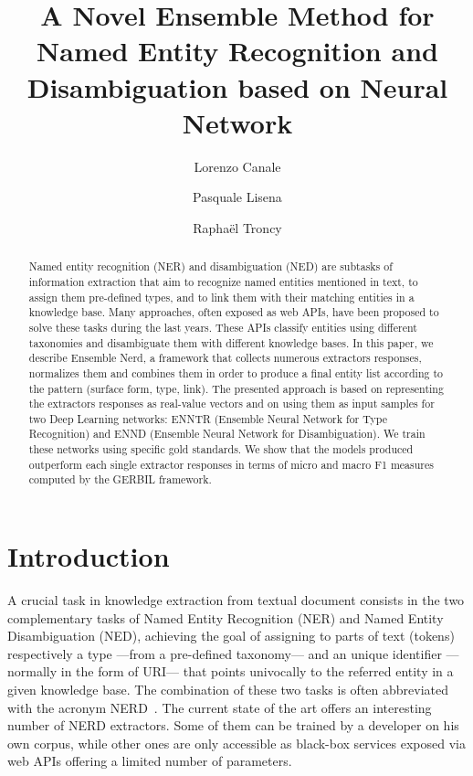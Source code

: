 \documentclass{llncs}
\begin{document}
\title{A Novel Ensemble Method for Named Entity Recognition and Disambiguation based on Neural Network}

\author{
Lorenzo Canale \and Pasquale Lisena
\and Rapha\"el Troncy}

\maketitle


\begin{abstract}
Named entity recognition (NER) and disambiguation (NED) are subtasks of information extraction that aim to recognize named entities mentioned in text, to assign them pre-defined types, and to link them with their matching entities in a knowledge base. Many approaches, often exposed as web APIs, have been proposed to solve these tasks during the last years. These APIs classify entities using different taxonomies and disambiguate them with different knowledge bases. In this paper, we describe Ensemble Nerd, a framework that collects numerous extractors responses, normalizes them and combines them in order to produce a final entity list according to the pattern (surface form, type, link). The presented approach is based on representing the extractors responses as real-value vectors and on using them as input samples for two Deep Learning networks: ENNTR (Ensemble Neural Network for Type Recognition) and ENND (Ensemble Neural Network for Disambiguation). We train these networks using specific gold standards. We show that the models produced outperform each single extractor responses in terms of micro and macro F1 measures computed by the GERBIL framework. 
\end{abstract}


\section{Introduction}
\label{sec:introduction}
A crucial task in knowledge extraction from textual document consists in the two complementary tasks of Named Entity Recognition (NER) and Named Entity Disambiguation (NED), achieving the goal of assigning to parts of text (tokens) respectively a type ---from a pre-defined taxonomy--- and an unique identifier ---normally in the form of URI--- that points univocally to the referred entity in a given knowledge base. The combination of these two tasks is often abbreviated with the acronym NERD~\cite{nerd1,nerd2}. The current state of the art offers an interesting number of NERD extractors. Some of them can be trained by a developer on his own corpus, while other ones are only accessible as black-box services exposed via web APIs offering a limited number of parameters.
\end{document}
